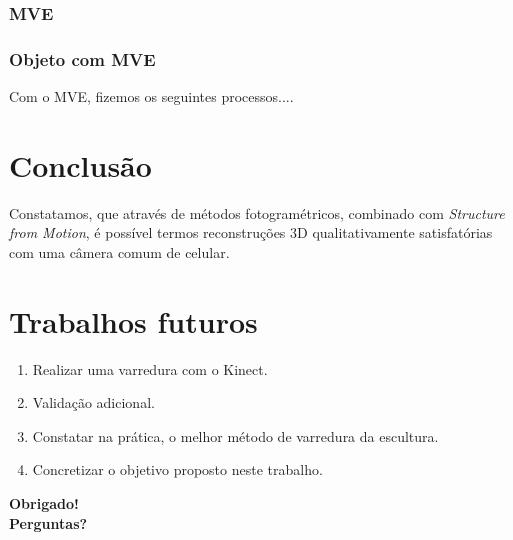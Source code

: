 \documentclass[table, usenames, svgnames, xcolor=dvipsnames]{beamer}
\begin{document}
\subsubsection{MVE}

\begin{frame}
\frametitle{\textbf{Objeto com MVE}}
	Com o MVE, fizemos os seguintes processos....
\end{frame}

\section{Conclusão}

\begin{frame}
	\begin{center}
	Constatamos, que através de métodos fotogramétricos, combinado com \emph{Structure from Motion}, é possível termos reconstruções 3D qualitativamente satisfatórias com uma câmera comum de celular.
	\end{center}

\end{frame}

\section{Trabalhos futuros}

\begin{frame}
	\begin{enumerate}
    	\item {Realizar uma varredura com o Kinect.}
 \item {Validação adicional.} 
\item {Constatar na prática, o melhor método de varredura da escultura.} 
\item {Concretizar o objetivo proposto neste trabalho.}
	\end{enumerate}
\end{frame}

{%
\begin{frame}[plain]
\begin{center}
{\huge \bf Obrigado! \\
Perguntas?}
\end{center}
	
\end{frame}
}
\end{document}
